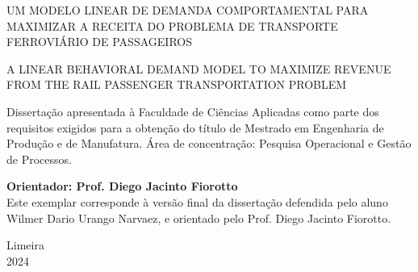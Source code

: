 \begin{center}
	{\sc \Large UM MODELO LINEAR DE DEMANDA COMPORTAMENTAL PARA MAXIMIZAR A RECEITA DO PROBLEMA DE TRANSPORTE FERROVIÁRIO DE PASSAGEIROS}
	\vspace*{1cm}
\end{center}

\begin{center}
	{\sc \Large A LINEAR BEHAVIORAL DEMAND MODEL TO MAXIMIZE REVENUE FROM THE RAIL PASSENGER TRANSPORTATION PROBLEM}
	\vspace*{1cm}
\end{center}


\vspace*{2.0cm}

\begin{flushright}
	\begin{minipage}{9.0cm}
		Dissertação apresentada à Faculdade de Ciências Aplicadas como parte dos
		requisitos exigidos para a obtenção do título de Mestrado em Engenharia de Produção e de Manufatura. Área de
		concentração: Pesquisa Operacional e Gestão de Processos.
	\end{minipage}
\end{flushright}
\vspace*{0.5cm}

\begin{flushleft}
	\begin{minipage}[c]{.5\textwidth}
		\textbf{Orientador: Prof. Diego Jacinto Fiorotto}\\
		Este exemplar corresponde à versão final da dissertação defendida pelo aluno Wilmer Dario Urango Narvaez, e orientado pelo Prof. Diego Jacinto Fiorotto.
	\end{minipage}
\end{flushleft}
\vspace*{0.5cm}

\begin{center}
	Limeira\\2024
\end{center}



